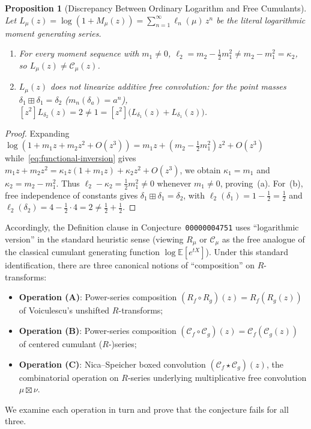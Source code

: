 \documentclass[11pt]{article}
\newtheorem{proposition}[theorem]{Proposition}
\theoremstyle{definition}
\newcommand{\boxconv}{\mathbin{\star}}
\begin{document}
\begin{proposition}[Discrepancy Between Ordinary Logarithm and Free Cumulants]\label{prop:premise}
Let $L_\mu(z) = \log(1 + M_\mu(z)) = \sum_{n=1}^{\infty} \ell_n(\mu)\,z^n$ be the literal logarithmic moment generating series.
\begin{enumerate}
  \item[(a)] For every moment sequence with $m_1 \neq 0$, $\ell_2 = m_2 - \frac{1}{2}m_1^2 \neq m_2 - m_1^2 = \kappa_2$, so $L_\mu(z) \neq \mathcal{C}_\mu(z)$.
  \item[(b)] $L_\mu(z)$ does not linearize additive free convolution: for the point masses $\delta_1 \boxplus \delta_1 = \delta_2$ ($m_n(\delta_a) = a^n$), $[z^2]L_{\delta_2}(z) = 2 \neq 1 = [z^2]\bigl(L_{\delta_1}(z) + L_{\delta_1}(z)\bigr)$.
\end{enumerate}
\end{proposition}
\begin{proof}
Expanding $\log(1 + m_1 z + m_2 z^2 + O(z^3)) = m_1 z + (m_2 - \frac{1}{2}m_1^2)z^2 + O(z^3)$ while~\eqref{eq:functional-inversion} gives $m_1 z + m_2 z^2 = \kappa_1 z(1 + m_1 z) + \kappa_2 z^2 + O(z^3)$, we obtain $\kappa_1 = m_1$ and $\kappa_2 = m_2 - m_1^2$. Thus $\ell_2 - \kappa_2 = \frac{1}{2}m_1^2 \neq 0$ whenever $m_1 \neq 0$, proving~(a). For~(b), free independence of constants gives $\delta_1 \boxplus \delta_1 = \delta_2$, with $\ell_2(\delta_1) = 1 - \frac{1}{2} = \frac{1}{2}$ and $\ell_2(\delta_2) = 4 - \frac{1}{2}\cdot 4 = 2 \neq \frac{1}{2} + \frac{1}{2}$.
\end{proof}

Accordingly, the Definition clause in Conjecture~\texttt{00000004751} uses ``logarithmic version'' in the standard heuristic sense (viewing $R_\mu$ or $\mathcal{C}_\mu$ as the free analogue of the classical cumulant generating function $\log \mathbb{E}[e^{tX}]$). Under this standard identification, there are three canonical notions of ``composition'' on $R$-transforms:
\begin{itemize}
  \item \textbf{Operation (A)}: Power-series composition $(R_f \circ R_g)(z) = R_f(R_g(z))$ of Voiculescu's unshifted $R$-transforms;
  \item \textbf{Operation (B)}: Power-series composition $(\mathcal{C}_f \circ \mathcal{C}_g)(z) = \mathcal{C}_f(\mathcal{C}_g(z))$ of centered cumulant ($R$-)series;
  \item \textbf{Operation (C)}: Nica--Speicher boxed convolution $(\mathcal{C}_f \boxconv \mathcal{C}_g)(z)$, the combinatorial operation on $R$-series underlying multiplicative free convolution $\mu \boxtimes \nu$.
\end{itemize}
We examine each operation in turn and prove that the conjecture fails for all three.
\end{document}
